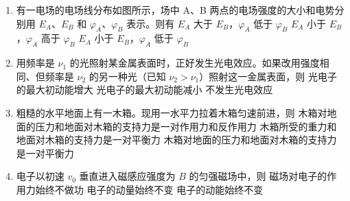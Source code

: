 \documentclass[\gkver]{gaokaozhenti}
\begin{document}
\begin{enumerate}

\item
有一电场的电场线分布如图所示，场中 A、B 两点的电场强度的大小和电势分别用 $E_{A}$、$E_{B}$ 和 $\varphi_{A}$、$\varphi_{B}$ 表示。则有
\onepicture[align=right, w=3.46cm]{}
{$E_{A}$ 大于 $E_{B}$，$\varphi_{A}$ 低于 $\varphi_{B}$}
{$E_{A}$ 小于 $E_{B}$，$\varphi_{A}$ 高于 $\varphi_{B}$}
{$E_{A}$ 小于 $E_{B}$，$\varphi_{A}$ 低于 $\varphi_{B}$}


\item
用频率是 $\nu_{1}$ 的光照射某金属表面时，正好发生光电效应。如果改用强度相同、但频率是 $\nu_{2}$ 的另一种光（已知 $\nu_{2} > \nu_{1}$）照射这一金属表面，则
{光电子的最大初动能增大}
{光电子的最大初动能减小}
{不发生光电效应}


\item
粗糙的水平地面上有一木箱。现用一水平力拉着木箱匀速前进，则
{木箱对地面的压力和地面对木箱的支持力是一对作用力和反作用力}
{木箱所受的重力和地面对木箱的支持力是一对平衡力}
{木箱对地面的压力和地面对木箱的支持力是一对平衡力}


\item
电子以初速 $v_{0}$ 垂直进入磁感应强度为 $B$ 的匀强磁场中，则
{磁场对电子的作用力始终不做功}
{电子的动量始终不变}
{电子的动能始终不变}


\end{enumerate}
\end{document}
